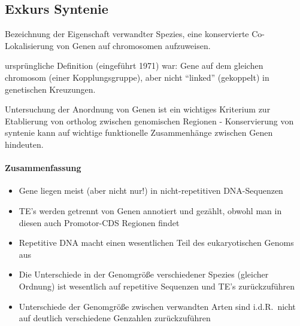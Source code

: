 

\subsection*{Exkurs Syntenie}
Bezeichnung der Eigenschaft verwandter Spezies, eine
konservierte Co-Lokalisierung von Genen auf \gls{chromosom}en
aufzuweisen.

ursprüngliche Definition (eingeführt 1971) war:
Gene auf dem gleichen \gls{chromosom} (einer Kopplungsgruppe),
aber nicht ``linked'' (gekoppelt) in genetischen Kreuzungen.

Untersuchung der Anordnung von Genen ist ein wichtiges Kriterium zur Etablierung
von \gls{ortholog} zwischen genomischen Regionen -
Konservierung von \gls{syntenie} kann auf wichtige funktionelle Zusammenhänge
zwischen Genen hindeuten.



\paragraph{Zusammenfassung}
\begin{itemize}
    \item Gene liegen meist (aber nicht nur!) in nicht-repetitiven
    DNA-Sequenzen
    \item TE's werden getrennt von Genen annotiert und gezählt,
    obwohl man in diesen auch Promotor-CDS Regionen findet
    \item Repetitive DNA macht einen wesentlichen Teil des
    eukaryotischen Genoms aus
    \item Die Unterschiede in der Genomgröße verschiedener
    Spezies (gleicher Ordnung) ist wesentlich auf repetitive
    Sequenzen und TE's zurückzuführen
    \item Unterschiede der Genomgröße zwischen verwandten Arten
    sind i.d.R.\ nicht auf deutlich verschiedene Genzahlen
    zurückzuführen
\end{itemize}




